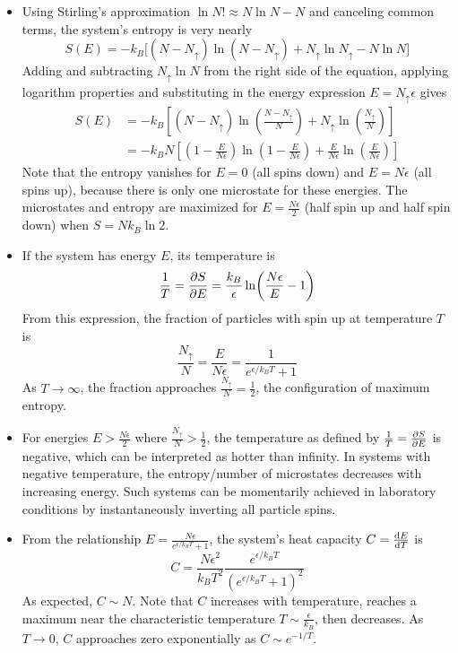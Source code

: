 \documentclass[11pt, a4paper]{article}
\begin{document}
\begin{itemize}
	\item Using Stirling's approximation $ \ln N! \approx N\ln N - N $ and canceling common terms, the system's entropy is very nearly
	\begin{equation*}
		S(E) = -k_{B}\big[ (N-N_{\uparrow})\ln(N-N_{\uparrow}) + N_{\uparrow}\ln N_{\uparrow} - N \ln N \big]
	\end{equation*}
	Adding and subtracting $ N_{\uparrow}\ln N $ from the right side of the equation, applying logarithm properties and substituting in the energy expression $ E = N_{\uparrow} \epsilon $ gives
	\begin{align*}
		S(E) &= -k_{B} \left[(N - N_{\uparrow})\ln(\frac{N - N_{\uparrow}}{N}) + N_{\uparrow} \ln(\frac{N_{\uparrow}}{N}) \right]\\
		&= -k_{B}N \left[\left (1 - \frac{E}{N\epsilon}\right )\ln(1 - \frac{E}{N\epsilon}) + \frac{E}{N\epsilon} \ln(\frac{E}{N\epsilon}) \right]
	\end{align*}
	Note that the entropy vanishes for $ E = 0 $ (all spins down) and $ E = N\epsilon $ (all spins up), because there is only one microstate for these energies. The microstates and entropy are maximized for $ E = \frac{N\epsilon}{2} $ (half spin up and half spin down) when $ S = N k_{B} \ln 2 $.
	
	\item If the system has energy $ E $, its temperature is
	\begin{equation*}
		\frac{1}{T} = \pdv{S}{E} = \frac{k_{B}}{\epsilon}\ln(\frac{N\epsilon}{E} - 1)
	\end{equation*}
	From this expression, the fraction of particles with spin up at temperature $ T $ is
	\begin{equation*}
		\frac{N_{\uparrow}}{N} = \frac{E}{N\epsilon} =  \frac{1}{e^{\epsilon/k_{B}T} + 1} 
	\end{equation*}
	As $ T \to \infty $, the fraction approaches $ \frac{N_{\uparrow}}{N} = \frac{1}{2} $, the configuration of maximum entropy.
	
	\item For energies $ E > \frac{N\epsilon}{2} $ where $ \frac{N_{\uparrow}}{N} > \frac{1}{2}$, the temperature as defined by $ \frac{1}{T} = \pdv{S}{E} $ is negative, which can be interpreted as hotter than infinity. In systems with negative temperature, the entropy/number of microstates decreases with increasing energy. Such systems can be momentarily achieved in laboratory conditions by instantaneously inverting all particle spins.
	
	\item From the relationship $ E = \frac{N\epsilon}{e^{\epsilon/k_{B}T} + 1} $, the system's heat capacity $ C = \dv{E}{T} $ is 
	\begin{equation*}
		C = \frac{N \epsilon^{2}}{k_{B}T^{2}} \frac{e^{\epsilon/k_{B}T}}{(e^{\epsilon/k_{B}T} + 1)^{2}} 
	\end{equation*}
	As expected, $ C \sim N $. Note that $ C $ increases with temperature, reaches a maximum near the characteristic temperature $ T \sim \frac{\epsilon}{k_{B}} $, then decreases. As $ T \to 0 $, $ C $ approaches zero exponentially as $ C \sim e^{-1/T} $.
\end{itemize}
\end{document}

